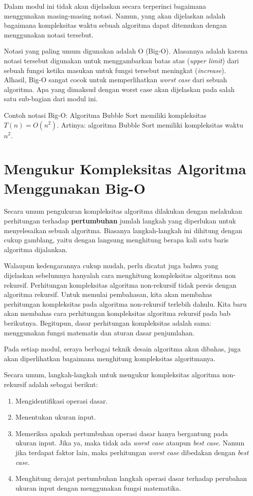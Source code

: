 Dalam modul ini tidak akan dijelaskan secara terperinci bagaimana menggunakan masing-masing notasi. Namun, yang akan dijelaskan adalah bagaimana kompleksitas waktu sebuah algoritma dapat ditemukan dengan menggunakan notasi tersebut.

Notasi yang paling umum digunakan adalah O (Big-O). Alasannya adalah karena notasi tersebut digunakan untuk menggambarkan batas atas (\textit{upper limit}) dari sebuah fungsi ketika masukan untuk fungsi tersebut meningkat (\textit{increase}). Alhasil, Big-O sangat cocok untuk memperlihatkan \textit{worst case} dari sebuah algoritma. Apa yang dimaksud dengan worst case akan dijelaskan pada salah satu sub-bagian dari modul ini.

Contoh notasi Big-O: Algoritma Bubble Sort memiliki kompleksitas $T(n) = O(n^2)$. Artinya: algoritma Bubble Sort memiliki kompleksitas waktu $n^2$. 

\section{Mengukur Kompleksitas Algoritma Menggunakan Big-O}

Secara umum pengukuran kompleksitas algoritma dilakukan dengan melakukan perhitungan terhadap \textbf{pertumbuhan} jumlah langkah yang diperlukan untuk menyelesaikan sebuah algoritma. Biasanya langkah-langkah ini dihitung dengan cukup gamblang, yaitu dengan langsung menghitung berapa kali satu baris algoritma dijalankan.

Walaupun kedengarannya cukup mudah, perlu dicatat juga bahwa yang dijelaskan sebelumnya hanyalah cara menghitung kompleksitas algoritma non rekursif. Perhitungan kompleksitas algoritma non-rekursif tidak persis dengan algoritma rekursif. Untuk memulai pembahasan, kita akan membahas perhitungan kompleksitas pada algoritma non-rekursif terlebih dahulu. Kita baru akan membahas cara perhitungan kompleksitas algoritma rekursif pada bab berikutnya. Begitupun, dasar perhitungan kompleksitas adalah sama: menggunakan fungsi matematis dan aturan dasar penjumlahan.

Pada setiap modul, seraya berbagai teknik desain algoritma akan dibahas, juga akan diperlihatkan bagaimana menghitung kompleksitas algoritmanya. 

Secara umum, langkah-langkah untuk mengukur kompleksitas algoritma non-rekursif adalah sebagai berikut:

\begin{enumerate}
    \item Mengidentifikasi operasi dasar.
    \item Menentukan ukuran input.
    \item Memeriksa apakah pertumbuhan operasi dasar hanya bergantung pada ukuran input. Jika ya, maka tidak ada \textit{worst case} ataupun \textit{best case}. Namun jika terdapat faktor lain, maka perhitungan \textit{worst case} dibedakan dengan \textit{best case}.
    \item Menghitung derajat pertumbuhan langkah operasi dasar terhadap perubahan ukuran input dengan menggunakan fungsi matematika.
\end{enumerate}

